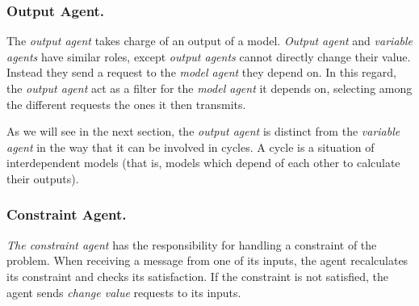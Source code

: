 \subsubsection*{Output Agent.}
The \emph{output agent} takes charge of an output of a model. \emph{Output agent} and \emph{variable agents} have similar roles, except \emph{output agents} cannot directly change their value. Instead they send a request to the \emph{model agent} they depend on. In this regard, the \emph{output agent} act as a filter for the \emph{model agent} it depends on, selecting among the different requests the ones it then transmits.


As we will see in the next section, the \emph{output agent} is distinct from the \emph{variable agent} in the way that it can be involved in cycles. A cycle is a situation of interdependent models (that is, models which depend of each other to calculate their outputs).


\subsubsection*{Constraint Agent.}
 \emph{The constraint agent} has the responsibility for handling a constraint of the problem. When receiving a message from one of its inputs, the agent recalculates its constraint and checks its satisfaction. If the constraint is not satisfied, the agent sends \emph{change value} requests to its inputs.


